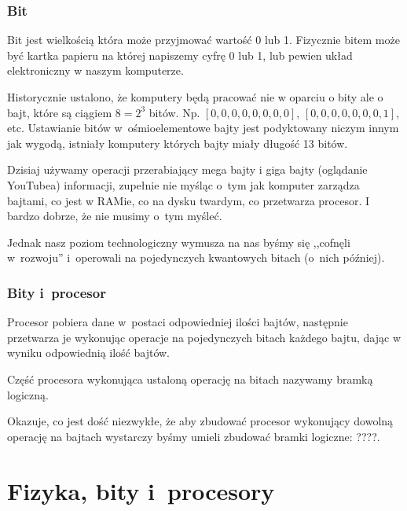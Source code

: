 \documentclass[10pt,t]{beamer}
\begin{document}
\begin{frame}
  \frametitle{Bit}


  Bit jest wielkością która może przyjmować wartość 0 lub 1. Fizycznie
  bitem może być kartka papieru na której napiszemy cyfrę 0 lub 1, lub
  pewien układ elektroniczny w naszym komputerze.

  Historycznie ustalono, że komputery będą pracować nie w oparciu o
  bity ale o bajt, które są ciągiem $8 = 2^{ 3 }$ bitów. Np.
  $[ 0, 0, 0, 0, 0, 0, 0, 0 ]$, $[ 0, 0, 0, 0, 0, 0, 0, 1 ]$, etc.
  Ustawianie bitów w~ośmioelementowe bajty jest podyktowany niczym
  innym jak wygodą, istniały komputery których bajty miały długość 13
  bitów.

  Dzisiaj używamy operacji przerabiający mega bajty i giga bajty
  (oglądanie YouTubea) informacji, zupełnie nie myśląc o~tym jak
  komputer zarządza bajtami, co jest w RAMie, co na dysku twardym, co
  przetwarza procesor. I bardzo dobrze, że nie musimy o~tym myśleć.

  Jednak nasz poziom technologiczny wymusza na nas byśmy się ,,cofnęli
  w~rozwoju'' i~operowali na pojedynczych kwantowych bitach (o~nich
  później).

\end{frame}





\begin{frame}
  \frametitle{Bity i~procesor}


  Procesor pobiera dane w~postaci odpowiedniej ilości bajtów,
  następnie przetwarza je wykonując operacje na \alert{pojedynczych}
  bitach każdego bajtu, dając w wyniku odpowiednią ilość bajtów.

  Część procesora wykonująca ustaloną operację na bitach nazywamy
  \alert{bramką logiczną}.

  Okazuje, co jest dość niezwykłe, że aby zbudować procesor wykonujący
  dowolną operację na bajtach wystarczy byśmy umieli zbudować bramki
  logiczne: {????}.

\end{frame}





\section{Fizyka, bity i~procesory}
\end{document}
